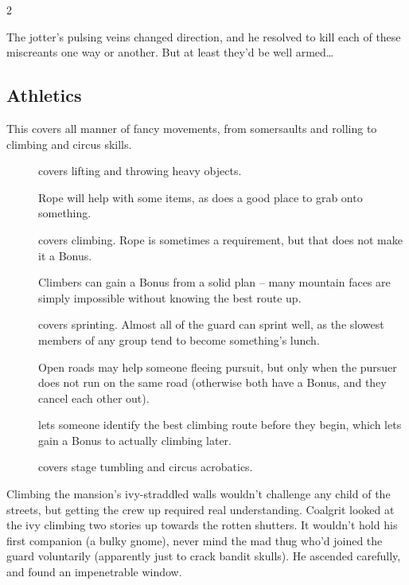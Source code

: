 \begin{multicols}{2}
\begin{exampletext}
  The \gls{jotter}'s pulsing veins changed direction, and he resolved to kill each of these miscreants one way or another.
  But at least they'd be well armed\ldots
\end{exampletext}

\subsection{Athletics}

This covers all manner of fancy movements, from somersaults and rolling to climbing and circus skills.


\begin{description}
  \item[]
    covers lifting and throwing heavy objects.

    Rope will help with some items, as does a good place to grab onto something.
  \item[]
    covers climbing.
    Rope is sometimes a requirement, but that does not make it a Bonus.

    Climbers can gain a Bonus from a solid plan -- many mountain faces are simply impossible without knowing the best route up.
  \item[]
    covers sprinting.
    Almost all of the \gls{guard} can sprint well, as the slowest members of any group tend to become something's lunch.

    Open roads may help someone fleeing pursuit, but only when the pursuer does not run on the same road (otherwise both have a Bonus, and they cancel each other out).
  \item[]
    lets someone identify the best climbing route before they begin, which lets gain a Bonus to actually climbing later.
  \item[]
    covers stage tumbling and circus acrobatics.
\end{description}

\begin{exampletext}
  Climbing the mansion's ivy-straddled walls wouldn't challenge any child of the streets, but getting the crew up required real understanding.
  Coalgrit looked at the ivy climbing two stories up towards the rotten shutters.
  It wouldn't hold his first companion (a bulky gnome), never mind the mad thug who'd joined the \gls{guard} voluntarily (apparently just to crack bandit skulls).
  He ascended carefully, and found an impenetrable window.


\end{exampletext}
\end{multicols}
